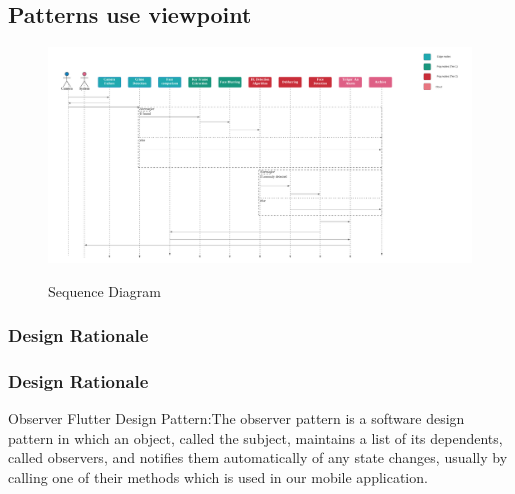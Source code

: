\documentclass[12pt]{article}
\begin{document}
 \FloatBarrier
\subsection{Patterns use viewpoint}
\FloatBarrier
\begin{figure}[h]
  \centering
  \includegraphics[width=20cm]{sequenceDiagram.png}
  \label{fig:2}
   \caption{Sequence Diagram}
\end{figure}
\subsubsection{Design Rationale}
\subsubsection{Design Rationale}
 Observer Flutter Design Pattern:The observer pattern is a software design pattern in which an object, called the subject, maintains a list of its dependents, called observers, and notifies them automatically of any state changes, usually by calling one of their methods which is used in our mobile application.



\newpage
\end{document}
